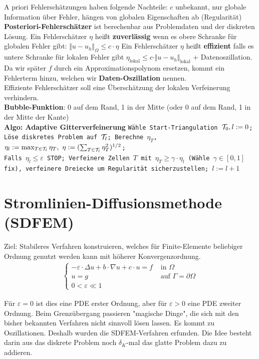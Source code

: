 \documentclass[12pt]{scrartcl}
\begin{document}
	A priori Fehlerschätzungen haben folgende Nachteile: $c$ unbekannt, nur globale Information über Fehler, hängen von globalen Eigenschaften ab (Regularität)\\
	\textbf{Posteriori-Fehlerschätzer} ist berechenbar aus Problemdaten und der diskreten Lösung.
	Ein Fehlerschätzer $\eta$ heißt \textbf{zuverlässig} wenn es obere Schranke für globalen Fehler gibt: $\Vert u-u_h\Vert_\Omega\leq c\cdot\eta$
	Ein Fehlerschätzer $\eta$ heißt \textbf{effizient} falls es untere Schranke für lokalen Fehler gibt $\eta_{\text{lokal}}\leq c\cdot\Vert u-u_h\Vert_{\text{lokal}}$ + Datenoszillation.
	Da wir später $f$ durch ein Approximationspolynom ersetzen, kommt ein Fehlerterm hinzu, welchen wir \textbf{Daten-Oszillation} nennen.\\
	Effiziente Fehlerschätzer soll eine Überschätzung der lokalen Verfeinerung verhindern.\\
	\textbf{Bubble-Funktion}: 0 auf dem Rand, 1 in der Mitte (oder 0 auf dem Rand, 1 in der Mitte der Kante)\\
	\textbf{Algo: Adaptive Gitterverfeinerung} \texttt{Wähle Start-Triangulation $\mathcal{T}_0,l:=0$;\\ Löse diskretes Problem auf $\mathcal{T}_l$; Berechne $\eta_T$, $\eta_l:=\max_{T\in\mathcal{T}_l}\eta_T,~\eta:=(\sum_{T\in\mathcal{T}_l}\eta_T^2)^{1/2}$;\\ Falls $\eta_l\leq\varepsilon$ STOP; Verfeinere Zellen $T$ mit $\eta_T\geq\gamma\cdot\eta_l$ (Wähle $\gamma\in[0,1]$ fix), verfeinere Dreiecke um Regularität sicherzustellen; $l:=l+1$}\\
	
		
	\section{Stromlinien-Diffusionsmethode (SDFEM)}
	
	Ziel: Stabileres Verfahren konstruieren, welches für Finite-Elemente beliebiger Ordnung genutzt werden kann mit höherer Konvergenzordnung.
	\begin{align*}
\left\lbrace
	\begin{array}{rl}
	-\varepsilon\cdot\Delta u+b\cdot \nabla u+c\cdot u=f&\text{ in }\Omega\\
	u=g&\text{ auf }\Gamma=\partial\Omega\\
	0<\varepsilon\ll 1&
	\end{array}
	\right.
\end{align*}

	Für $\varepsilon=0$ ist dies eine PDE erster Ordnung, aber für $\varepsilon>0$ eine PDE zweiter Ordnung.
	Beim Grenzübergang passieren "magische Dinge", die sich mit den bisher bekannten Verfahren nicht sinnvoll lösen lassen.
	Es kommt zu Oszillationen.
	Deshalb wurden die SDFEM-Verfahren erfunden.
	Die Idee besteht darin aus das diskrete Problem noch $\delta_K$-mal das glatte Problem dazu zu addieren.
	
\end{document}
